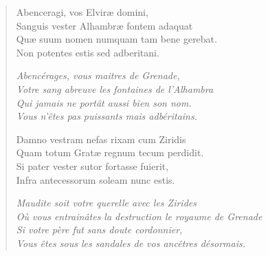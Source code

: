 \setlength\LTleft{-1.7cm}%
\begin{verse}%
  \quatrain%
  Abenceragi, vos Elviræ domini,           \\  %
  Sanguis vester Alhambræ fontem adaquat  \\  %
  Quæ suum nomen numquam tam bene gerebat. \\  %
  Non potentes estis sed adberitani.     

  \emph{Abencérages, vous maitres de Grenade,}\\  %
  \emph{Votre sang abreuve les fontaines de l’Alhambra}\\  %
  \emph{Qui jamais ne portât aussi bien son nom.}\\  %
  \emph{Vous n’êtes pas puissants mais adbéritains.}

  Damno vestram nefas rixam cum Ziridis   \\  %
  Quam totum Gratæ regnum tecum perdidit. \\  %
  Si pater vester sutor fortasse fuierit, \\  %
  	Infra antecessorum soleam nunc estis.

  \emph{Maudite soit votre querelle avec les Zirides}\\  %
  \emph{Où vous entrainâtes la destruction le royaume de Grenade}\\  %
  \emph{Si votre père fut sans doute cordonnier,}\\  %
  \emph{Vous êtes sous les sandales de vos ancêtres désormais.}
\end{verse}

